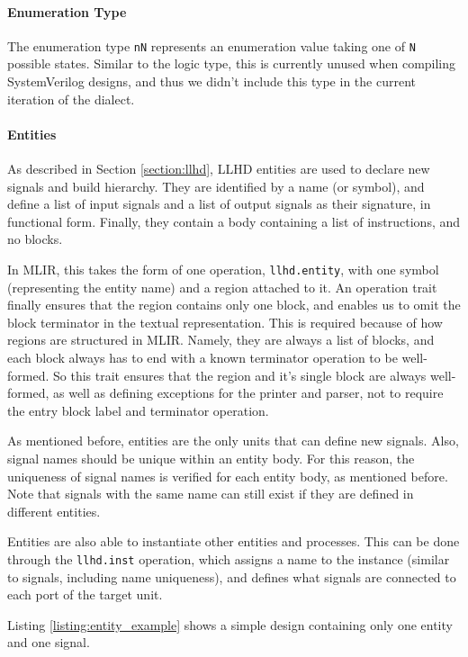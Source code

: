 \paragraph{Enumeration Type}
The enumeration type \texttt{nN} represents an enumeration value taking one of \texttt{N} possible states. Similar to the logic type, this is currently unused when compiling SystemVerilog designs, and thus we didn't include this type in the current iteration of the dialect.

\paragraph{Entities}
As described in Section \ref{section:llhd}, LLHD entities are used to declare new signals and build hierarchy. They are identified by a name (or symbol), and define a list of input signals and a list of output signals as their signature, in functional form. Finally, they contain a body containing a list of instructions, and no blocks.

In MLIR, this takes the form of one operation, \texttt{llhd.entity}, with one symbol (representing the entity name) and a region attached to it. An operation trait finally ensures that the region contains only one block, and enables us to omit the block terminator in the textual representation. This is required because of how regions are structured in MLIR. Namely, they are always a list of blocks, and each block always has to end with a known terminator operation to be well-formed. So this trait ensures that the region and it's single block are always well-formed, as well as defining exceptions for the printer and parser, not to require the entry block label and terminator operation.

As mentioned before, entities are the only units that can define new signals. Also, signal names should be unique within an entity body. For this reason, the uniqueness of signal names is verified for each entity body, as mentioned before. Note that signals with the same name can still exist if they are defined in different entities.

Entities are also able to instantiate other entities and processes. This can be done through the \texttt{llhd.inst} operation, which assigns a name to the instance (similar to signals, including name uniqueness), and defines what signals are connected to each port of the target unit.

Listing \ref{listing:entity_example} shows a simple design containing only one entity and one signal.

